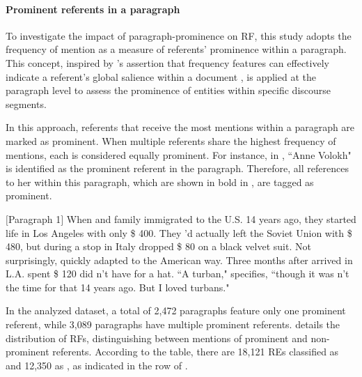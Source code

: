\paragraph*{Prominent referents in a paragraph}

To investigate the impact of paragraph-prominence on RF, this study adopts the frequency of mention as a measure of referents' prominence within a paragraph. This concept, inspired by \citeauthor{siddharthan2011information}'s assertion that frequency features can effectively indicate a referent's global salience within a document \citeyearpar{siddharthan2011information}, is applied at the paragraph level to assess the prominence of entities within specific discourse segments.

In this approach, referents that receive the most mentions within a paragraph are marked as prominent. When multiple referents share the highest frequency of mentions, each is considered equally prominent. For instance, in , ``Anne Volokh" is identified as the prominent referent in the paragraph. Therefore, all references to her within this paragraph, which are shown in bold in , are tagged as prominent.

\begin{exe}
	\ex\label{ex:volokh} 
	\begin{xlist}
		\ex $[$Paragraph 1$]$ When  and  family immigrated to the U.S. 14 years ago, they started life in Los Angeles with only \$ 400. They 'd actually left the Soviet Union with \$ 480, but during a stop in Italy  dropped \$ 80 on a black velvet suit. Not surprisingly,  quickly adapted to the American way. Three months after  arrived in L.A.  spent \$ 120  did n't have for a hat. ``A turban,"  specifies, ``though it was n't the time for that 14 years ago. But I loved turbans."
		
	\end{xlist}
\end{exe}

In the analyzed dataset, a total of 2,472 paragraphs feature only one prominent referent, while 3,089 paragraphs have multiple prominent referents.  details the distribution of RFs, distinguishing between mentions of prominent and non-prominent referents. According to the table, there are 18,121 REs classified as  and 12,350 as , as indicated in the  row of .

